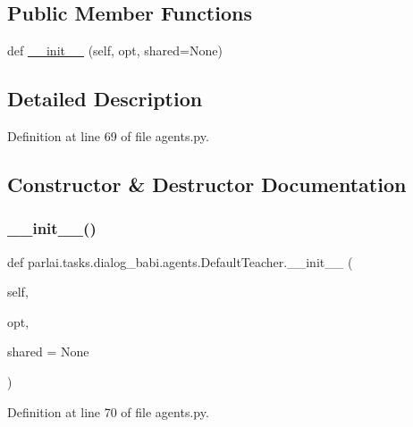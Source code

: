 \subsection*{Public Member Functions}
\begin{DoxyCompactItemize}
\item 
def \hyperlink{classparlai_1_1tasks_1_1dialog__babi_1_1agents_1_1DefaultTeacher_a973ffa6cd8da99b24a2009f79c4431c4}{\+\_\+\+\_\+init\+\_\+\+\_\+} (self, opt, shared=None)
\end{DoxyCompactItemize}


\subsection{Detailed Description}


Definition at line 69 of file agents.\+py.



\subsection{Constructor \& Destructor Documentation}
\mbox{\label{classparlai_1_1tasks_1_1dialog__babi_1_1agents_1_1DefaultTeacher_a973ffa6cd8da99b24a2009f79c4431c4}} 
\subsubsection{\texorpdfstring{\+\_\+\+\_\+init\+\_\+\+\_\+()}{\_\_init\_\_()}}
{\footnotesize\ttfamily def parlai.\+tasks.\+dialog\+\_\+babi.\+agents.\+Default\+Teacher.\+\_\+\+\_\+init\+\_\+\+\_\+ (\begin{DoxyParamCaption}\item[{}]{self,  }\item[{}]{opt,  }\item[{}]{shared = {\ttfamily None} }\end{DoxyParamCaption})}



Definition at line 70 of file agents.\+py.


